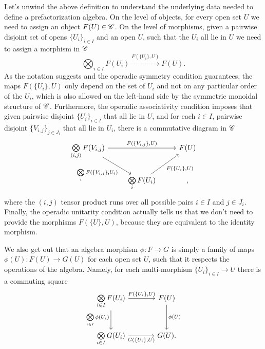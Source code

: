 \documentclass[../text]{subfiles}
\begin{document}
\begin{remark}
    Let's unwind the above definition to understand the underlying data needed to define a prefactorization algebra. On the level of objects, for every open set $U$ we need to assign an object $F(U) \in \mathscr{C}$. On the level of morphisms, given a pairwise disjoint set of opens $\{U_i\}_{i \in I}$ and an open $U$, such that the $U_i$ all lie in $U$ we need to assign a morphism in $\mathscr{C}$
    \begin{equation}
        \bigotimes_{i \in I} F(U_i) \xrightarrow{F(\{U_i\},U)} F(U).
    \end{equation}
    As the notation suggests and the operadic symmetry condition guarantees, the maps $F(\{U_i\},U)$ only depend on the set of $U_i$ and not on any particular order of the $U_i$, which is also allowed on the left-hand side by the symmetric monoidal structure of $\mathscr{C}$. Furthermore, the operadic associativity condition imposes that given pairwise disjoint $\{U_i\}_{i \in I}$ that all lie in $U$, and for each $i \in I$, pairwise disjoint $\{ V_{i, j}\}_{j \in J_i}$ that all lie in $U_i$, there is a commutative diagram in $\mathscr{C}$
    \begin{equation}
        \begin{tikzcd}
            \bigotimes\limits_{(i,j)} F(V_{i,j}) \arrow[rd, shorten <=-2ex, "\bigotimes\limits_{i} F(\{V_{i, j}\} {,} U_i)"'] \arrow[rr, "F( \{V_{i, j}\} {,} U)"] &   & F(U) \\
            & \bigotimes\limits_{i} F(U_i) \arrow[ru, "F( \{U_i \} {,} U)"'] &,          
        \end{tikzcd}
    \end{equation}
    where the $(i,j)$ tensor product runs over all possible pairs $i \in I$ and $j \in J_i$. Finally, the operadic unitarity condition actually tells us that we don't need to provide the morphisms $F(\{U\}, U)$, because they are equivalent to the identity morphism.

    We also get out that an algebra morphism $\phi: F \rightarrow G$ is simply a family of maps $\phi(U): F(U) \rightarrow G(U)$ for each open set $U$, such that it respects the operations of the algebra. Namely, for each multi-morphism $\{ U_i \}_{i \in I} \rightarrow U$ there is a commuting square
    \begin{equation}\label{cd:fa_morphisms}
        \begin{tikzcd}[row sep=large, column sep = large]
            \bigotimes\limits_{i \in I} F(U_i) \arrow[r, "F(\{ U_i\} {,} U)"] \arrow[d, "\bigotimes\limits_{i \in I} \phi(U_i)"'] & F(U) \arrow[d, "\phi(U)"] \\
            \bigotimes\limits_{i \in I} G(U_i) \arrow[r, "G(\{ U_i\} {,} U)"'] & G(U).
        \end{tikzcd}
    \end{equation}

\end{remark}
\end{document}
